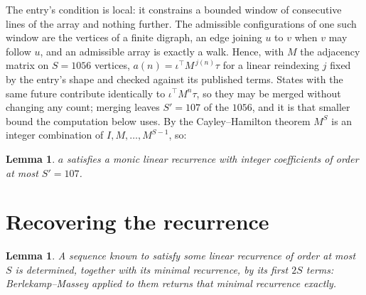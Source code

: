 \documentclass[11pt,a4paper]{article}
\theoremstyle{plain}
\newtheorem{lemma}[theorem]{Lemma}
\theoremstyle{definition}
\begin{document}
The entry's condition is local: it constrains a bounded window of consecutive lines of the
array and nothing further. The admissible configurations of one such window are the vertices
of a finite digraph, an edge joining $u$ to $v$ when $v$ may follow $u$, and an admissible
array is exactly a walk. Hence, with $M$ the adjacency matrix on $S=1056$ vertices,
$a(n)=\iota^{\!\top}M^{\,j(n)}\tau$ for a linear reindexing $j$ fixed by the entry's shape
and checked against its published terms. States with the same future contribute identically to $\iota^{\!\top}M^n\tau$, so they may be merged without changing any count; merging leaves $S'=107$ of the $1056$, and it is that smaller bound the computation below uses. By the Cayley--Hamilton theorem $M^{S}$ is an
integer combination of $I,M,\dots,M^{S-1}$, so:

\begin{lemma}\label{lem:cf}
$a$ satisfies a monic linear recurrence with integer coefficients of order at most
$S'=107$.
\end{lemma}

\section{Recovering the recurrence}

\begin{lemma}\label{lem:bm}
A sequence known to satisfy some linear recurrence of order at most $S$ is determined, together
with its minimal recurrence, by its first $2S$ terms: Berlekamp--Massey applied to them returns
that minimal recurrence exactly.
\end{lemma}
\end{document}
